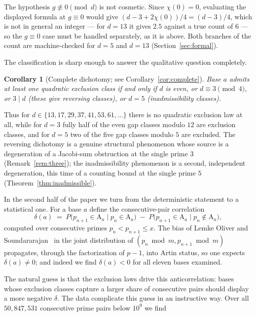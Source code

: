\documentclass[11pt,reqno]{amsart}
\theoremstyle{plain}
\newtheorem{corollary}[theorem]{Corollary}
\theoremstyle{definition}
\newcommand{\Art}{\mathrm{A}}
\begin{document}
The hypothesis $g \not\equiv 0 \pmod d$ is not cosmetic. Since $\chi(0) = 0$,
evaluating the displayed formula at $g \equiv 0$ would give
$(d - 3 + 2\chi(0))/4 = (d-3)/4$, which is not in general an integer --- for
$d = 13$ it gives $2.5$ against a true count of $6$ --- so the $g \equiv 0$
case must be handled separately, as it is above. Both branches of the count
are machine-checked for $d = 5$ and $d = 13$ (Section~\ref{sec:formal}).

The classification is sharp enough to answer the qualitative question
completely.

\begin{corollary}[Complete dichotomy; see Corollary~\ref{cor:complete}]
Base $a$ admits at least one quadratic exclusion class if and only if $d$ is
even, or $d \equiv 3 \pmod 4$, or $3 \mid d$ (these give reversing classes), or
$d = 5$ (inadmissibility classes).
\end{corollary}

Thus for $d \in \{13, 17, 29, 37, 41, 53, 61, \dots\}$ there is no quadratic
exclusion law at all, while for $d = 3$ fully half of the even gap classes
modulo $12$ are exclusion classes, and for $d = 5$ two of the five
gap classes modulo $5$ are excluded. The reversing dichotomy is a genuine
structural phenomenon whose source is a degeneration of a Jacobi-sum
obstruction at the single prime $3$ (Remark~\ref{rem:three}); the
inadmissibility phenomenon is a second, independent degeneration, this time of
a counting bound at the single prime $5$
(Theorem~\ref{thm:inadmissible}).

In the second half of the paper we turn from the deterministic statement to a
statistical one. For a base $a$ define the consecutive-pair correlation
\begin{equation}
\label{eq:delta}
  \delta(a) \;=\; P\bigl(p_{n+1} \in \Art_a \mid p_n \in \Art_a\bigr)
             \;-\; P\bigl(p_{n+1} \in \Art_a \mid p_n \notin \Art_a\bigr),
\end{equation}
computed over consecutive primes $p_n < p_{n+1} \le x$. The bias of
Lemke Oliver and Soundararajan~\cite{LOS2016} in the joint distribution of
$(p_n \bmod m, p_{n+1} \bmod m)$ propagates, through the factorization of
$p - 1$, into Artin status, so one expects $\delta(a) \neq 0$; and indeed we
find $\delta(a) < 0$ for all eleven bases examined.

The natural guess is that the exclusion laws drive this anticorrelation: bases
whose exclusion classes capture a larger share of consecutive pairs should
display a more negative $\delta$. The data complicate this guess in an
instructive way. Over all $50{,}847{,}531$ consecutive prime pairs below
$10^9$ we find
\end{document}
